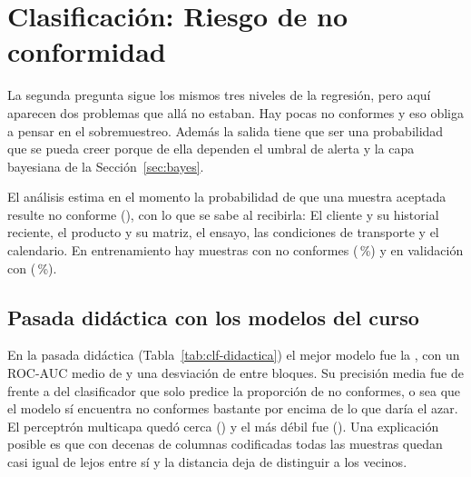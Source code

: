 \section{Clasificación: Riesgo de no conformidad}
\label{sec:clasificacion}

La segunda pregunta sigue los mismos tres niveles de la regresión, pero aquí
aparecen dos problemas que allá no estaban. Hay pocas no conformes y eso
obliga a pensar en el sobremuestreo. Además la salida tiene que ser una
probabilidad que se pueda creer porque de ella dependen el umbral de alerta
y la capa bayesiana de la Sección~\ref{sec:bayes}.

El análisis \codigo{\ClfAnalisis} estima en el momento \codigo{\ClfMomento}
la probabilidad de que una muestra aceptada resulte no conforme
(\codigo{\ClfObjetivo}), con lo que se sabe al recibirla: El cliente y su
historial reciente, el producto y su matriz, el ensayo, las condiciones de
transporte y el calendario. En entrenamiento hay
\ClfMuestrasEntrenamiento{} muestras con \ClfPositivosEntrenamiento{} no
conformes (\ClfPrevalenciaEntrenamientoPct{}\,\%) y en validación
\ClfMuestrasValidacion{} con \ClfPositivosValidacion{}
(\ClfPrevalenciaValidacionPct{}\,\%).

\subsection{Pasada didáctica con los modelos del curso}

En la pasada didáctica (Tabla~\ref{tab:clf-didactica}) el mejor modelo fue la
\MakeLowercase{\ClfMejorDidactico}, con un ROC-AUC medio de
\ClfAUCMejorDidactico{} y una desviación de \ClfAUCDesvMejorDidactico{} entre
bloques. Su precisión media fue de \ClfPrecisionMediaMejorDidactico{} frente a
\ClfDummyPrecisionMedia{} del clasificador que solo predice la proporción de
no conformes, o sea que el modelo sí encuentra no conformes bastante por
encima de lo que daría el azar. El perceptrón multicapa quedó cerca
(\ClfAUCMLPDidactico{}) y el más débil fue \ClfPeorDidactico{}
(\ClfAUCPeorDidactico{}). Una explicación posible es que con decenas de
columnas codificadas todas las muestras quedan casi igual de lejos entre sí y
la distancia deja de distinguir a los vecinos.

